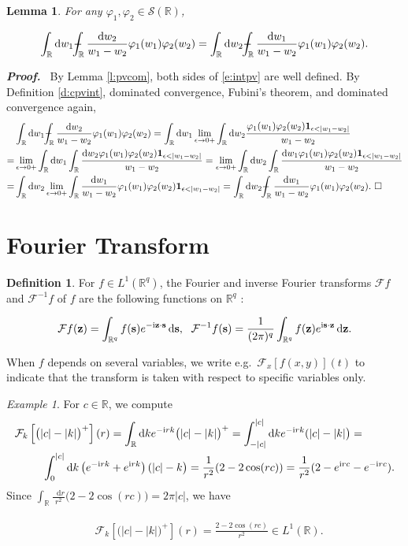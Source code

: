 \documentclass[11pt,A4,twoside]{article}
\newcommand\ind{\mathbf{1}}
\numberwithin{equation}{section}
\renewcommand{\vec}{\mathbf}
\newcommand{\intcc}{\dashint}
\newcommand{\F}{\mathcal{F}}
\renewcommand*\d{\mathop{}\!\mathrm{d}}
\newcommand{\z}{\mathbf{z}}
\newcommand{\R}{\mathbbm{R}}
\renewcommand{\S}{\mathcal{S}}
\newcommand{\intR}{\int_{\R}}
\def\Phint#1{\mathchoice
  {\XXint\displaystyle\textstyle{#1}}%
  {\XXint\textstyle\scriptstyle{#1}}%
  {\XXint\scriptstyle\scriptscriptstyle{#1}}%
  {\XXint\scriptscriptstyle\scriptscriptstyle{#1}}%
  \!\int}
\def\XXint#1#2#3{{\setbox0=\hbox{$#1{#2#3}{\int}$}
    \vcenter{\hbox{$#2#3$}}\kern-.5\wd0}}
\def\dashint{\Phint-}
\def\qqq{\;\;\;\;\;\;\;\;\;}
\def\bel{\begin{eqnarray*}\begin{aligned}}
\def\eel{\end{aligned}\end{eqnarray*}}
\newcommand{\beqa}{\begin{eqnarray}}
\newcommand{\eeqa}{\end{eqnarray}}
\def\bal{\begin{aligned}}
\def\eal{\end{aligned}}
\def\bll#1{
\beqa\label{#1}\bal
}\def\lel{\eal\eeqa}
\newcommand{\beql}[1]{\bll{#1}}
\newcommand{\eeql}{\lel}
\newtheorem{lemma}[theorem]{Lemma}
\theoremstyle{definition}
\newtheorem{definition}{Definition}[section]
\theoremstyle{remark}
\newtheorem{example}[remark]{Example}
\def\sp{,\;}
\def\z{\vec z}
\def\R{\mathbb{R}}
\def\finproof {$\Box$ \vskip 5 pt }\def\finproof{\rule{4pt}{6pt}}\def\finproof{\ensuremath{\square}}
\def\proof{\noindent \emph{\textbf{Proof.} $\, $}}
\def\thermi{{\rm i}}%
\begin{document}
\begin{lemma}\label{prop:intpv} For any $\varphi_1,\varphi_2 \in \S(\R) $,  
\beql{e:intpv}
    \int_\R \d w_1 \intcc_\R \frac{\d w_2}{w_1-w_2}\varphi_1(w_1)\varphi_2(w_2) = \int_\R \d w_2 \intcc_\R \frac{\d w_1}{w_1-w_2}\varphi_1(w_1)\varphi_2(w_2).
\eeql   
\end{lemma}
\proof
By Lemma \ref{l:pvcom}, both sides of \eqref{e:intpv} are well defined.  By Definition \ref{d:cpvint}, dominated convergence, Fubini's theorem, and dominated convergence again,
\bel
 &\int_\R \d w_1 \intcc_\R \frac{\d w_2}{w_1-w_2} \varphi_1(w_1)\varphi_2(w_2)=  \int_\R \d w_1 \lim_{\epsilon \to 0+} \int_\R \d w_2\frac{\varphi_1(w_1)\varphi_2(w_2)\ind_{\epsilon<|w_1-w_2|}}{w_1-w_2}\\
 =&   \lim_{\epsilon \to 0+} \int_\R \d w_1 \int_\R 
 \frac{\d w_2 \varphi_1(w_1)\varphi_2(w_2)\ind_{\epsilon<|w_1-w_2|}}{w_1-w_2}=   \lim_{\epsilon \to 0+} \int_\R \d w_2\int_\R  
\frac{\d w_1\varphi_1(w_1)\varphi_2(w_2)\ind_{\epsilon<|w_1-w_2|}}{w_1-w_2} \\
 =&\int_\R\d w_2 \lim_{\epsilon \to 0+}  \int_\R  \frac{\d w_1}{w_1-w_2} \varphi_1(w_1)\varphi_2(w_2)\ind_{\epsilon<|w_1-w_2|}= \int_\R \d w_2 \intcc_\R \frac{\d w_1}{w_1-w_2}\varphi_1(w_1)\varphi_2(w_2).\ \finproof
\eel
 


\section{Fourier Transform}\label{a:fourier}

\def\s{\vec s}
\begin{definition}
 For $f\in L^1 (\R^q) $, the Fourier and inverse Fourier transforms $\F f$ and $\F^{-1} f$ of $f$ are the following functions on $\R^q$ \citep[Section 2.6 and 15.6]{king_2009}:
\beql{e:ffm}
     \F f (\z) = \int_{\R^q} f(\vec s) e^{-\thermi  \z \cdot \vec s} \d \vec s
     \sp\   \F^{-1} f (\s) = \frac{1}{(2\pi)^q} \int_{\R^q} f (\z) e^{\thermi  \s\cdot \z} \d \z  .   
\eeql
\end{definition}
\noindent
When $f$ depends on several variables, we write e.g.\ $\F_{x}[f(x,y)](t)$ to indicate that the transform is taken with respect to specific variables only.

  \begin{example}\label{l:c}
For $c\in\R$, we compute
\bel
    & \F_k\left[ \big(|c| - |k |\big)^+\right](r)
    = \intR \d k e^{-\thermi rk} \big(|c| - |k |\big)^+
    = \int_{-|c|}^{|c|} \d k e^{-\thermi rk} (|c| - |k |\big)=
    \\
     & 
   \qqq \int_0^{|c|} \d k \left(e^{-\thermi rk} + e^{\thermi rk}\right) (|c| - k\big)
    = \frac{1}{r^2}(2-2\cos(r c)) = \frac{1}{r^2}(2-e^{\thermi  r c}-e^{-\thermi  r c}).%
\eel
Since $\int_{\R} \frac{\d r}{r^2} \big(2-2\cos(r c)\big)   = 2\pi |c|$, we have
\beql{e:c}
    & \F_k\left[ \big(|c| - |k |\big)^+\right](r) 
    = \frac{2-2\cos(r c)}{r^2}\in L^1 (\R) .
\eeql
\end{example} 
\end{document}
